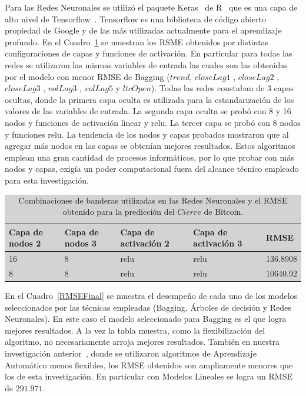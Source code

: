 \documentclass[a4paper,12pt,twocolumn]{article}
\begin{document}
Para las Redes Neuronales se utilizó el paquete Keras~\cite{keras} de R~\cite{r} que es una capa de alto nivel de Tensorflow~\cite{tensorflow}. Tensorflow es una biblioteca de código abierto propiedad de Google y de las más utilizadas actualmente para el aprendizaje profundo. En el Cuadro~\ref{redesModelTuning} se muestran los RSME obtenidos por distintas configuraciones de capas y funciones de activación. En particular para todas las redes se utilizaron las mismas variables de entrada  las cuales son las obtenidas por el modelo con menor RMSE de Bagging ($trend$, $closeLag1$ , $closeLag2$ , $closeLag3$ ,  $volLag3$ , $volLag5$ y $ltcOpen$). Todas las redes constaban de 3 capas ocultas, donde la primera capa oculta es utilizada para la estandarización de los valores de las variables de entrada. La segunda capa oculta se probó con 8 y 16 nodos y funciones de activación linear y relu. La  tercer capa se probó con 8 nodos y funciones relu. La tendencia de los nodos y capas probados mostraron que al agregar más nodos en las capas se obtenían mejores resultados. Estos algoritmos emplean una gran cantidad de procesos informáticos, por lo que probar con más nodos y capas, exigía un poder computacional fuera del alcance técnico empleado para esta investigación. 


\begin{table}[!hbt]
\centering
\caption{Combinaciones de banderas utilizadas en las Redes Neuronales y el RMSE obtenido para la predicción del $Cierre$ de Bitcoin. }
\label{redesModelTuning}
\begingroup\setlength{\fboxsep}{0pt}
\colorbox{lightgray}{%
\begin{tabular}{|l|l|l|l|l|}
\hline Capa de nodos 2 & Capa de nodos 3 & Capa de activación 2 & Capa de activación 3 & RMSE \\
\hline 16 & 8 & relu & relu  &  136.8908\\
\hline 8 & 8 & relu & relu  &  10640.92\\
\hline
\end{tabular}%
}\endgroup
\end{table}

En el Cuadro~\ref{RMSEFinal} se muestra el desempeño de cada uno de los modelos seleccionados por las técnicas empleadas (Bagging, Árboles de decisión y Redes Neuronales). En este caso el modelo seleccionado para Bagging es el que logra mejores resultados. A la vez la tabla muestra, como la flexibilización del algoritmo, no necesariamente arroja mejores resultados. También en nuestra investigación anterior~\cite{paper1}, donde se utilizaron algoritmos de Aprendizaje Automático menos flexibles, los RMSE obtenidos son ampliamente menores que los de esta investigación. En particular con Modelos Lineales se logra un RMSE de $291.971$.
\end{document}
